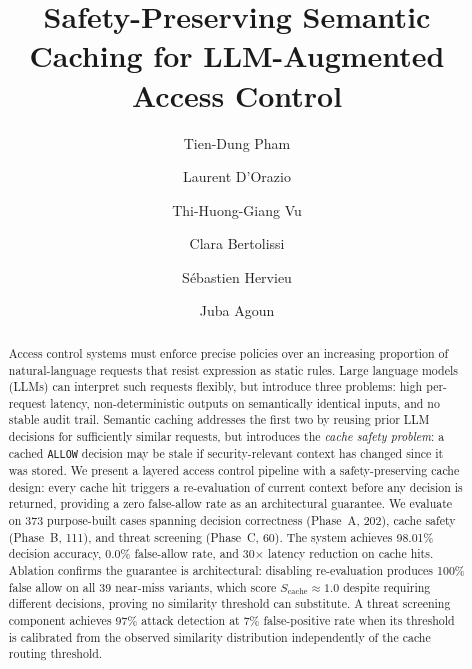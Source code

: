 \documentclass[runningheads]{llncs}
\begin{document}
%
\title{Safety-Preserving Semantic Caching for LLM-Augmented Access Control}

\author{Tien-Dung Pham \and
Laurent D'Orazio \and
Thi-Huong-Giang Vu \and
Clara Bertolissi\and
Sébastien Hervieu \and
Juba Agoun}
%
%
%
\maketitle              %
%
\begin{abstract}
Access control systems must enforce precise policies over an increasing proportion of natural-language requests that resist expression as static rules. Large language models (LLMs) can interpret such requests flexibly, but introduce three problems: high per-request latency, non-deterministic outputs on semantically identical inputs, and no stable audit trail. Semantic caching addresses the first two by reusing prior LLM decisions for sufficiently similar requests, but introduces the \emph{cache safety problem}: a cached \texttt{ALLOW} decision may be stale if security-relevant context has changed since it was stored. We present a layered access control pipeline with a safety-preserving cache design: every cache hit triggers a re-evaluation of current context before any decision is returned, providing a zero false-allow rate as an architectural guarantee. We evaluate on 373 purpose-built cases spanning decision correctness (Phase~A, 202), cache safety (Phase~B, 111), and threat screening (Phase~C, 60). The system achieves 98.01\% decision accuracy, 0.0\% false-allow rate, and 30$\times$ latency reduction on cache hits. Ablation confirms the guarantee is architectural: disabling re-evaluation produces 100\% false allow on all 39 near-miss variants, which score $S_{\text{cache}}\approx 1.0$ despite requiring different decisions, proving no similarity threshold can substitute. A threat screening component achieves 97\% attack detection at 7\% false-positive rate when its threshold is calibrated from the observed similarity distribution independently of the cache routing threshold.

\end{abstract}
\end{document}
